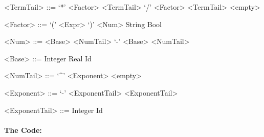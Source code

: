 \documentclass[10pt]{article}
\begin{document}
\begin{multicols}{2}
\begin{grammar}
<TermTail>	::=	`*'	<Factor>	<TermTail>	
\alt			`/'	<Factor>	<TermTail>
\alt	<empty>

<Factor>	::=	`('	<Expr> `)'
\alt		String			
\alt		Bool			

<Num>	::=	<Base> <NumTail>	
\alt		`-'	<Base> <NumTail>	

<Base> ::=	Integer	
\alt	Real	
\alt	Id

<NumTail>	::=	`^'	<Exponent>	
\alt	<empty>

<Exponent>	::=	`-'	<ExponentTail>	
\alt				<ExponentTail>


<ExponentTail>	::=	Integer	
\alt					Id

\end{grammar}
\end{multicols}
\paragraph{The Code:}





























\end{document}
